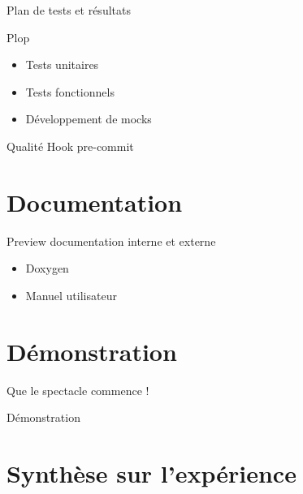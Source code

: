 \documentclass[frenchb]{beamer}
\begin{document}
\begin{frame}{Plan de tests et résultats}
    \begin{block}{Plop}
        \begin{itemize}
            \item Tests unitaires
            \item Tests fonctionnels
            \item Développement de mocks
        \end{itemize}
    \end{block}

    \begin{block}{Qualité}
        Hook pre-commit
    \end{block}
\end{frame}

\section{Documentation}

\begin{frame}{Preview documentation interne et externe}
    \begin{itemize}
        \item Doxygen
        \item Manuel utilisateur
    \end{itemize}
\end{frame}

\section{Démonstration}

\begin{frame}{Que le spectacle commence !}
    \begin{center}
        Démonstration
    \end{center}
\end{frame}

\section{Synthèse sur l’expérience}
\end{document}
